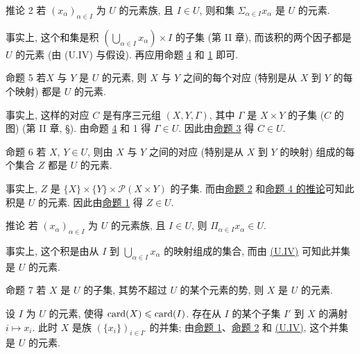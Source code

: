 \hypertarget{sga4.exp.I.appendix.II.sec.1.corollary.to.proposition.4.2}{}
\begin{enonce*}{推论 2}
若 $(x_{\alpha})_{\alpha \in I}$ 为 $U$ 的元素族, 且 $I\in U$, 则和集 $\Sigma_{\alpha \in I} x_{\alpha}$ 是 $U$ 的元素.
\end{enonce*}
事实上, 这个和集是积 $(\bigcup_{\alpha\in I} x_{\alpha})\times I$ 的子集 (第 II 章), 而该积的两个因子都是 $U$ 的元素 (由 (U.IV) 与假设). 再应用命题 \hyperlink{sga4.exp.I.appendix.II.sec.1.proposition.4}{4} 和 \hyperlink{sga4.exp.I.appendix.II.sec.1.proposition.1}{1} 即可.

\hypertarget{sga4.exp.I.appendix.II.sec.1.proposition.5}{}
\begin{enonce*}{命题 5}
若\pageoriginale $X$ 与 $Y$ 是 $U$ 的元素, 则 $X$ 与 $Y$ 之间的每个对应 (特别是从 $X$ 到 $Y$ 的每个映射) 都是 $U$ 的元素.
\end{enonce*}
事实上, 这样的对应 $C$ 是有序三元组 $(X,Y,\Gamma)$, 其中 $\Gamma$ 是 $X\times Y$ 的子集 ($C$ 的图) (第 II 章, \S). 由命题 \hyperlink{sga4.exp.I.appendix.II.sec.1.proposition.4}{4} 和 1 得 $\Gamma\in U$. 因此由\hyperlink{sga4.exp.I.appendix.II.sec.1.proposition.3}{命题 3} 得 $C\in U$.

\hypertarget{sga4.exp.I.appendix.II.sec.1.proposition.6}{}
\begin{enonce*}{命题 6}
若 $X$, $Y\in U$, 则由 $X$ 与 $Y$ 之间的对应 (特别是从 $X$ 到 $Y$ 的映射) 组成的每个集合 $Z$ 都是 $U$ 的元素.
\end{enonce*}
事实上, $Z$ 是 $\{X\}\times \{Y\}\times\mathcal{P}(X\times Y)$ 的子集. 而由\hyperlink{sga4.exp.I.appendix.II.sec.1.proposition.2}{命题 2} 和\hyperlink{sga4.exp.I.appendix.II.sec.1.corollary.to.proposition.4.1}{命题 4 的推论}可知此积是 $U$ 的元素. 因此由\hyperlink{sga4.exp.I.appendix.II.sec.1.proposition.1}{命题 1} 得 $Z\in U$.

\hypertarget{sga4.exp.I.appendix.II.sec.1.corollary.to.proposition.6}{}
\begin{enonce*}{推论}
若 $(x_{\alpha})_{\alpha \in I}$ 为 $U$ 的元素族, 且 $I\in U$, 则 $\Pi_{\alpha\in I}x_{\alpha} \in U$.
\end{enonce*}
事实上, 这个积是由从 $I$ 到 $\bigcup_{\alpha\in I}x_{\alpha}$ 的映射组成的集合, 而由 \hyperlink{sga4.exp.I.appendix.II.sec.1.definition.1.condition.U.IV}{(U.IV)} 可知此并集是 $U$ 的元素.

\hypertarget{sga4.exp.I.appendix.II.sec.1.proposition.7}{}
\begin{enonce*}{命题 7}
若 $X$ 是 $U$ 的子集, 其势不超过 $U$ 的某个元素的势, 则 $X$ 是 $U$ 的元素.
\end{enonce*}
设 $I$ 为 $U$ 的元素, 使得 $\operatorname{card}(X)\leqslant \operatorname{card}(I)$. 存在从 $I$ 的某个子集 $I'$ 到 $X$ 的满射 $i\mapsto x_i$. 此时 $X$ 是族 $(\{x_i\})_{i\in I'}$ 的并集; 由\hyperlink{sga4.exp.I.appendix.II.sec.1.proposition.1}{命题 1}、\hyperlink{sga4.exp.I.appendix.II.sec.1.proposition.2}{命题 2} 和 \hyperlink{sga4.exp.I.appendix.II.sec.1.definition.1.condition.U.IV}{(U.IV)}, 这个并集是 $U$ 的元素.


